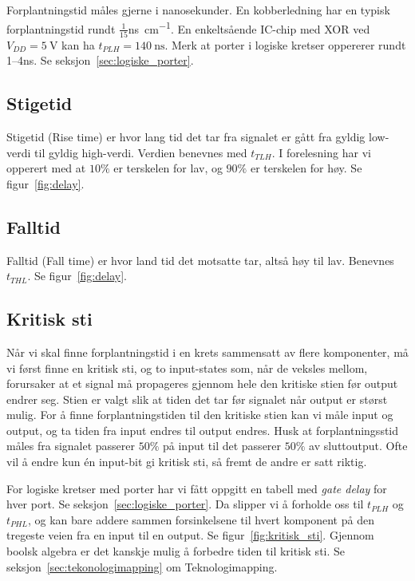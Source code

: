 \documentclass[12pt,a4paper,norsk]{article}
\begin{document}
Forplantningstid måles gjerne i nanosekunder. En kobberledning har en typisk
forplantningstid rundt $\frac{1}{15}$\si[per-mode =
fraction]{\nano\second\per\centi\meter}. En enkeltsående IC-chip med XOR ved
$V_{DD}=\SI{5}{\volt}$ kan ha $t_{PLH} = \SI{140}{\nano\second}$. Merk
at porter i logiske kretser oppererer rundt 1--4\si{\nano\second}. Se
seksjon~\ref{sec:logiske_porter}.

\subsection{Stigetid}
Stigetid (Rise time) er hvor lang tid det tar fra signalet
er gått fra gyldig low-verdi til gyldig high-verdi. Verdien benevnes med
$t_{TLH}$. I forelesning har vi opperert med at $10\%$ er terskelen for lav, og
$90\%$ er terskelen for høy. Se figur~\ref{fig:delay}.

\subsection{Falltid}
Falltid (Fall time) er hvor land tid det motsatte tar, altså høy til lav.
Benevnes $t_{THL}$. Se figur~\ref{fig:delay}.

\subsection{Kritisk sti}\label{sec:kritisk_sti}
Når vi skal finne forplantningstid i en krets sammensatt av flere komponenter,
må vi først finne en kritisk sti, og to input-states som, når de veksles mellom,
forursaker at et signal må propageres gjennom hele den kritiske stien før output
endrer seg. Stien er valgt slik at tiden det tar før signalet når output er størst
mulig. For å finne forplantningstiden til den kritiske stien kan vi måle input og
output, og ta tiden fra input endres til output endres. Husk at
forplantningsstid måles fra signalet passerer $50\%$ på input til det passerer
$50\%$ av sluttoutput. Ofte vil å endre kun én input-bit gi kritisk sti, så
fremt de andre er satt riktig.

For logiske kretser med porter har vi fått oppgitt en tabell med \textit{gate
 delay} for hver port. Se seksjon~\ref{sec:logiske_porter}. Da slipper vi å
forholde oss til $t_{PLH}$ og $t_{PHL}$, og kan bare addere sammen
forsinkelsene til hvert komponent på den tregeste veien fra en input til en
output. Se figur~\ref{fig:kritisk_sti}. Gjennom boolsk algebra er det kanskje
mulig å forbedre tiden til kritisk sti. Se seksjon~\ref{sec:tekonologimapping}
om Teknologimapping.
\end{document}
